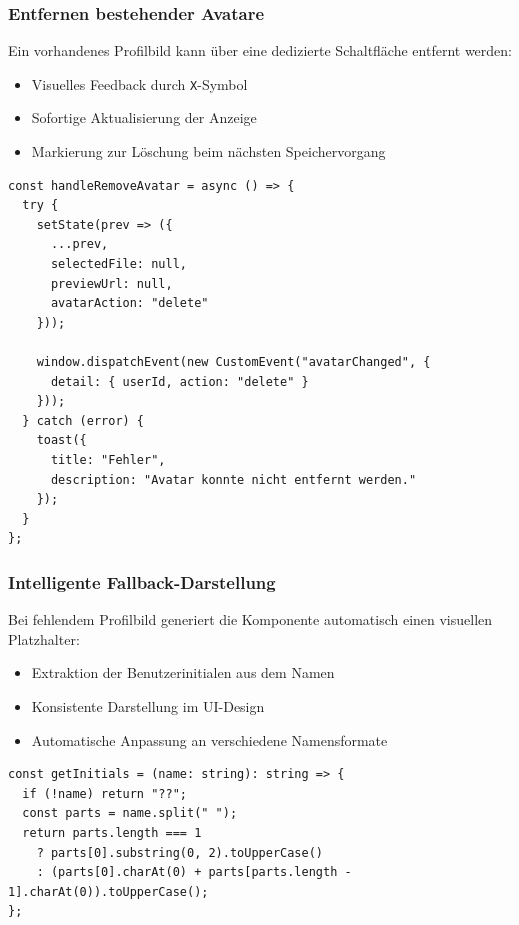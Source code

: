 \begin{inhalt}
\subsubsection{Entfernen bestehender Avatare}
Ein vorhandenes Profilbild kann über eine dedizierte Schaltfläche entfernt werden:
\begin{itemize}
    \item Visuelles Feedback durch \texttt{X}-Symbol
    \item Sofortige Aktualisierung der Anzeige
    \item Markierung zur Löschung beim nächsten Speichervorgang
\end{itemize}

\begin{lstlisting}[style=mytsx, caption={Implementierung der Avatar-Löschung}, label={lst:avatar_delete}]
const handleRemoveAvatar = async () => {
  try {
    setState(prev => ({
      ...prev,
      selectedFile: null,
      previewUrl: null,
      avatarAction: "delete"
    }));
    
    window.dispatchEvent(new CustomEvent("avatarChanged", {
      detail: { userId, action: "delete" }
    }));
  } catch (error) {
    toast({
      title: "Fehler",
      description: "Avatar konnte nicht entfernt werden."
    });
  }
};
\end{lstlisting}

\subsubsection{Intelligente Fallback-Darstellung}
Bei fehlendem Profilbild generiert die Komponente automatisch einen visuellen Platzhalter:
\begin{itemize}
    \item Extraktion der Benutzerinitialen aus dem Namen
    \item Konsistente Darstellung im UI-Design
    \item Automatische Anpassung an verschiedene Namensformate
\end{itemize}

\begin{lstlisting}[style=mytsx, caption={Generierung der Fallback-Initialen}, label={lst:avatar_initials}]
const getInitials = (name: string): string => {
  if (!name) return "??";
  const parts = name.split(" ");
  return parts.length === 1
    ? parts[0].substring(0, 2).toUpperCase()
    : (parts[0].charAt(0) + parts[parts.length - 1].charAt(0)).toUpperCase();
};
\end{lstlisting}


\end{inhalt}
